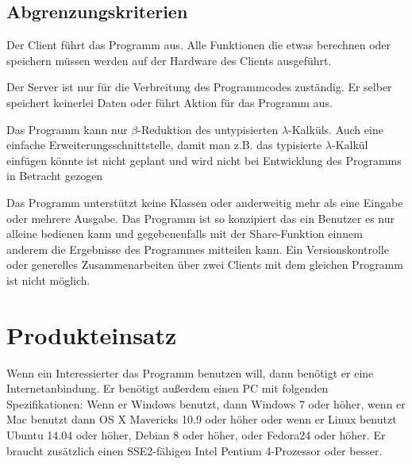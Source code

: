 \documentclass[parskip=full,11pt,twoside]{scrartcl}
\begin{document}













\subsection{Abgrenzungskriterien}

Der Client führt das Programm aus. Alle Funktionen die etwas berechnen oder speichern müssen werden auf der Hardware des Clients ausgeführt.

Der Server ist nur für die Verbreitung des Programmcodes zuständig. Er selber speichert keinerlei Daten oder führt Aktion für das Programm aus.

Das Programm kann nur $\beta$-Reduktion des untypisierten $\lambda$-Kalküls. Auch eine einfache Erweiterungsschnittstelle, damit man z.B. das typisierte $\lambda$-Kalkül einfügen könnte ist nicht geplant und wird nicht bei Entwicklung des Programms in Betracht gezogen

Das Programm unterstützt keine Klassen oder anderweitig mehr als eine Eingabe oder mehrere Ausgabe.
Das Programm ist so konzipiert das ein Benutzer es nur alleine bedienen kann und gegebenenfalls mit der Share-Funktion einnem anderem die Ergebnisse des Programmes mitteilen kann. Ein Versionskontrolle oder generelles Zusammenarbeiten über zwei Clients mit dem gleichen Programm ist nicht möglich.



\pagebreak
\section{Produkteinsatz}

Wenn ein Interessierter das Programm benutzen will, dann benötigt er eine Internetanbindung. Er benötigt  außerdem einen PC mit folgenden Spezifikationen: Wenn er Windows benutzt, dann Windows 7 oder höher, wenn er Mac benutzt dann OS X Mavericks 10.9 oder höher oder wenn er Linux benutzt Ubuntu 14.04 oder höher, Debian 8 oder höher, oder Fedora24 oder höher.
Er braucht zusätzlich einen SSE2-fähigen Intel Pentium 4-Prozessor oder besser.
\end{document}
